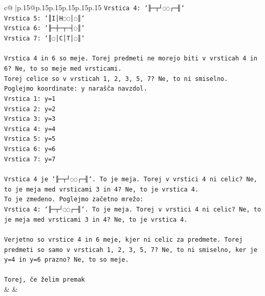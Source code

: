 \documentclass{article}
\begin{document}
{\begin{supertabular}{c@{$\;$}|p{.15\linewidth}@{}p{.15\linewidth}p{.15\linewidth}p{.15\linewidth}p{.15\linewidth}p{.15\linewidth}}
{{{\texttt{Vrstica 4: `╟─┬┘◌◌┌─╢`} \\
\texttt{Vrstica 5: `║I│H◌◌│◌║`} \\
\texttt{Vrstica 6: `╟─┼─┬─┤◌║`} \\
\texttt{Vrstica 7: `║◌│C│T│◌║`} \\
\\ 
\texttt{Vrstica 4 in 6 so meje. Torej predmeti ne morejo biti v vrsticah 4 in 6? Ne, to so meje med vrsticami.} \\
\texttt{Torej celice so v vrsticah 1, 2, 3, 5, 7? Ne, to ni smiselno.} \\
\texttt{Poglejmo koordinate: y narašča navzdol.} \\
\texttt{Vrstica 1: y=1} \\
\texttt{Vrstica 2: y=2} \\
\texttt{Vrstica 3: y=3} \\
\texttt{Vrstica 4: y=4} \\
\texttt{Vrstica 5: y=5} \\
\texttt{Vrstica 6: y=6} \\
\texttt{Vrstica 7: y=7} \\
\\ 
\texttt{Vrstica 4 je `╟─┬┘◌◌┌─╢`. To je meja. Torej v vrstici 4 ni celic? Ne, to je meja med vrsticami 3 in 4? Ne, to je vrstica 4.} \\
\texttt{To je zmedeno. Poglejmo začetno mrežo:} \\
\texttt{Vrstica 4: `╟─┬┘◌◌┌─╢`. To je meja. Torej v vrstici 4 ni celic? Ne, to je meja med vrsticami 3 in 4? Ne, to je vrstica 4.} \\
\\ 
\texttt{Verjetno so vrstice 4 in 6 meje, kjer ni celic za predmete. Torej predmeti so samo v vrsticah 1, 2, 3, 5, 7? Ne, to ni smiselno, ker je y=4 in y=6 prazno? Ne, to so meje.} \\
\\ 
\texttt{Torej, če želim premak} \\
            }
        }
    }
    & & \\ \\


\end{supertabular}}
\end{document}
